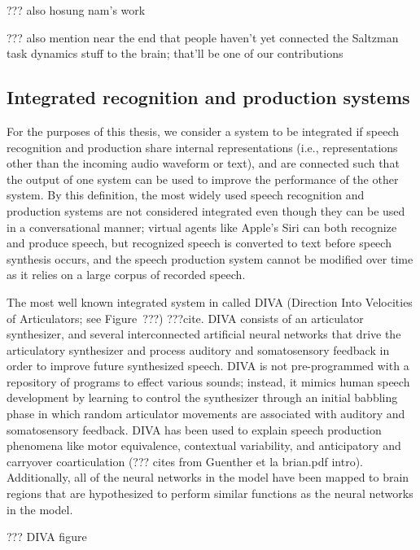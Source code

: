 ??? also hosung nam's work

??? also mention near the end that people haven't
yet connected the Saltzman task dynamics stuff
to the brain; that'll be one of our contributions

\subsection{Integrated recognition and production systems}

For the purposes of this thesis,
we consider a system to be integrated
if speech recognition and production
share internal representations
(i.e., representations other than
the incoming audio waveform or text),
and are connected such that
the output of one system
can be used to improve
the performance of the other system.
By this definition,
the most widely used
speech recognition and production systems
are not considered integrated
even though they can be used
in a conversational manner;
virtual agents like Apple's Siri
can both recognize and produce speech,
but recognized speech is converted
to text before speech synthesis occurs,
and the speech production system
cannot be modified over time
as it relies on a large corpus
of recorded speech.

The most well known integrated system
in called DIVA
(Direction Into Velocities of Articulators;
see Figure~???) ???cite.
DIVA consists of an articulator synthesizer,
and several interconnected artificial neural networks
that drive the articulatory synthesizer
and process auditory and somatosensory feedback
in order to improve future synthesized speech.
DIVA is not pre-programmed with a repository
of programs to effect various sounds;
instead, it mimics human speech development
by learning to control the synthesizer
through an initial babbling phase
in which random articulator movements
are associated with auditory
and somatosensory feedback.
DIVA has been used to explain
speech production phenomena
like motor equivalence, contextual variability,
and anticipatory and carryover coarticulation
(??? cites from Guenther et la brian.pdf intro).
Additionally, all of the neural networks
in the model have been mapped
to brain regions that are hypothesized
to perform similar functions
as the neural networks in the model.

??? DIVA figure

